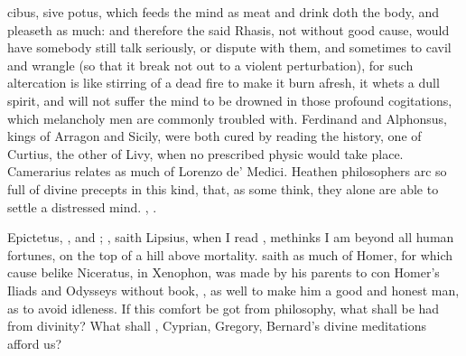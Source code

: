 {cibus, sive potus, which feeds the mind as meat and drink doth the
body, and pleaseth as much: and therefore the said Rhasis, not without
good cause, would have somebody still talk seriously, or dispute with
them, and sometimes to cavil and wrangle (so that it break not
out to a violent perturbation), for such altercation is like stirring
of a dead fire to make it burn afresh, it whets a dull spirit, and will
not suffer the mind to be drowned in those profound cogitations, which
melancholy men are commonly troubled with. Ferdinand and
Alphonsus, kings of Arragon and Sicily, were both cured by reading the
history, one of Curtius, the other of Livy, when no prescribed physic
would take place. Camerarius relates as much of Lorenzo de'
Medici. Heathen philosophers arc so full of divine precepts in this
kind, that, as some think, they alone are able to settle a distressed
mind. , \etc{}.

Epictetus, \Plutarch, and \Seneca; , saith Lipsius,
 when I read \Seneca, methinks I am beyond
all human fortunes, on the top of a hill above mortality. \Plutarch
saith as much of Homer, for which cause belike Niceratus, in Xenophon,
was made by his parents to con Homer's Iliads and Odysseys without
book, , as well to make him a good and honest
man, as to avoid idleness. If this comfort be got from philosophy, what
shall be had from divinity? What shall \Austin{}, Cyprian, Gregory,
Bernard's divine meditations afford us?

}
